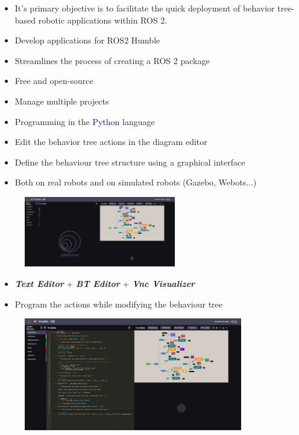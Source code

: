 \documentclass[notes,slidesec,a4]{seminar}
\begin{document}
\begin{hslide}
\begin{itemize}
\item It's primary objective is to facilitate the quick deployment of behavior tree-based robotic applications within ROS 2. 
\item Develop applications for ROS2 Humble
\item Streamlines the process of creating a ROS 2 package
\item Free and open-source
\end{itemize}

  \newpage
\begin{itemize}
\item Manage multiple projects
\item Programming in the \textcolor{blue}{Python} language
\item Edit the behavior tree actions in the diagram editor 
\item Define the behaviour tree structure using a graphical interface
\item Both on real robots and on simulated robots (Gazebo, Webots...)
  \end{itemize}
  \begin{figure}
    \centerline{\includegraphics[width=6.6cm]{figs/screenshot1.png}}
  \end{figure}
  
\newpage
{}
\begin{itemize}
  \item \textbf{\textit{Text Editor}} + \textbf{\textit{{BT Editor}}} + \textbf{\textit{Vnc Visualizer}}
  \item Program the actions while modifying the behaviour tree \normalsize

\end{itemize}
  \begin{figure}
    \hspace{1cm}
    \includegraphics[width=9.5cm]{figs/screenshot3.png}
\end{figure}


\end{hslide}
\end{document}
